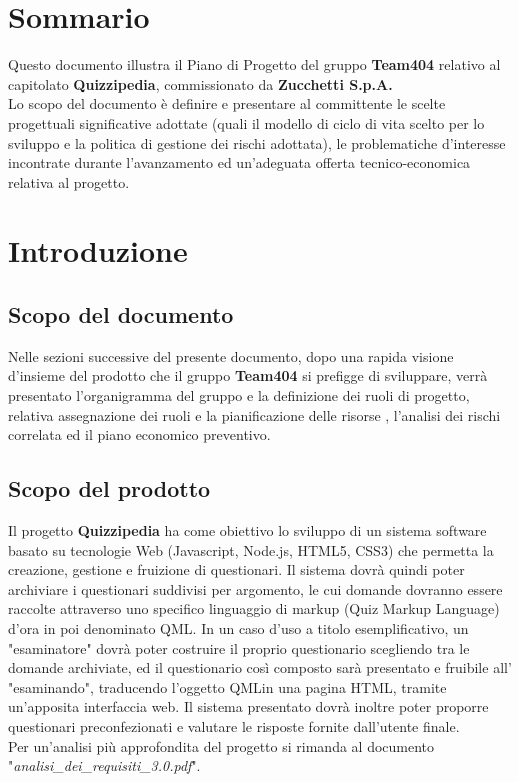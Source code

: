 \documentclass[a4paper,11pt]{article}
\begin{document}
	\newpage
	\tableofcontents
	
	\newpage
	\listoftables
	\listoffigures	
	
	\newpage
	\section{Sommario}
	Questo documento illustra il Piano di Progetto del gruppo \textbf{Team404} relativo al capitolato \textbf{Quizzipedia}, commissionato da \textbf{Zucchetti S.p.A.}
	\\
	Lo scopo del documento è definire e presentare al committente le scelte progettuali significative adottate (quali il modello di ciclo di vita scelto per lo sviluppo e la politica di gestione dei rischi adottata), le problematiche d'interesse incontrate durante l'avanzamento ed un'adeguata offerta tecnico-economica relativa al progetto.
	
	\newpage
	\section{Introduzione}
	\subsection{Scopo del documento}
	Nelle sezioni successive del presente documento, dopo una rapida visione d'insieme del prodotto che il gruppo \textbf{Team404} si prefigge di sviluppare, verrà presentato l'organigramma del gruppo e la definizione dei ruoli di progetto, relativa assegnazione dei ruoli e la pianificazione delle risorse , l'analisi dei rischi correlata ed il piano economico preventivo.
	\subsection{Scopo del prodotto}
	Il progetto \textbf{Quizzipedia} ha come obiettivo lo sviluppo di un sistema software basato su tecnologie Web (Javascript\addglos, Node.js\addglos, HTML5\addglos, CSS3\addglos) che permetta la creazione, gestione e fruizione di questionari. Il sistema dovrà quindi poter archiviare i questionari suddivisi per argomento, le cui domande dovranno essere raccolte attraverso uno specifico linguaggio di markup (Quiz Markup Language) d'ora in poi denominato QML\addglos. In un caso d'uso a titolo esemplificativo, un "esaminatore" dovrà poter costruire il proprio questionario scegliendo tra le domande archiviate, ed il questionario così composto sarà presentato e fruibile all' "esaminando", traducendo l'oggetto QML\addglos in una pagina HTML\addglos, tramite un'apposita interfaccia web. Il sistema presentato dovrà inoltre poter proporre questionari preconfezionati e valutare le risposte fornite dall'utente finale.
	\\
	Per un'analisi più approfondita del progetto si rimanda al documento "\textit{analisi\_dei\_requisiti\_3.0.pdf}".
\end{document}
